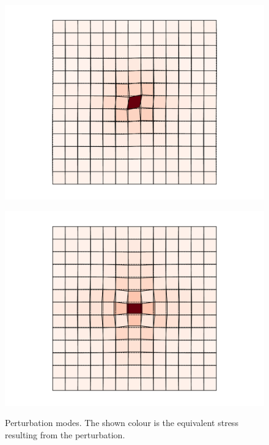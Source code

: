 \documentclass{goose-article}
\begin{document}
\begin{figure}[htp]
    \centering
    \captionsetup[subfigure]{justification=centering}
    \begin{minipage}[t]{.49\textwidth}
        \centering
        \includegraphics[width=\textwidth]{perturbation_simple-shear.pdf}
        \label{fig:perturbation:simple-shear}
    \end{minipage}
    \hfill
    \begin{minipage}[t]{.49\textwidth}
        \centering
        \includegraphics[width=\textwidth]{perturbation_pure-shear.pdf}
        \label{fig:perturbation:pure-shear}
    \end{minipage}
    \caption{
        Perturbation modes.
        The shown colour is the equivalent stress resulting from the perturbation.}
    \label{fig:perturbation}
\end{figure}
\end{document}
